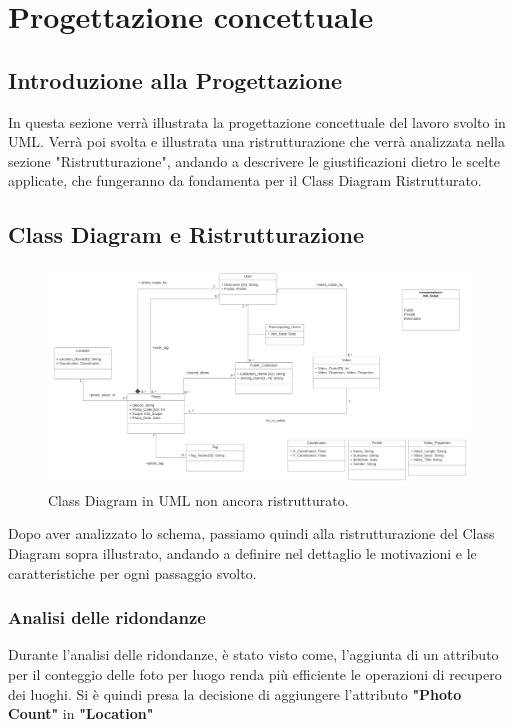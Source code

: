 \chapter{Progettazione concettuale}

    \section{Introduzione alla Progettazione}
    
    In questa sezione verrà illustrata la progettazione concettuale del lavoro svolto in UML. Verrà poi svolta e illustrata una ristrutturazione che verrà analizzata nella sezione "Ristrutturazione", andando a descrivere le giustificazioni dietro le scelte applicate, che fungeranno da fondamenta per il Class Diagram Ristrutturato.
        
    \section{Class Diagram e Ristrutturazione}
        \begin{figure}[h]
           \centering
           \includegraphics[width=1\linewidth]{Immagini/plogico1.png}
           \caption{Class Diagram in UML non ancora ristrutturato.}
        \end{figure}
    Dopo aver analizzato lo schema, passiamo quindi alla ristrutturazione del Class Diagram sopra illustrato, andando a definire nel dettaglio le motivazioni e le caratteristiche per ogni passaggio svolto.
        
        \subsection{Analisi delle ridondanze}

        Durante l'analisi delle ridondanze, è stato visto come, l'aggiunta di un attributo per il conteggio delle foto per luogo renda più efficiente le operazioni di recupero dei luoghi. Si è quindi presa la decisione di aggiungere l'attributo \textbf{"Photo Count"} in \textbf{"Location"}
            
